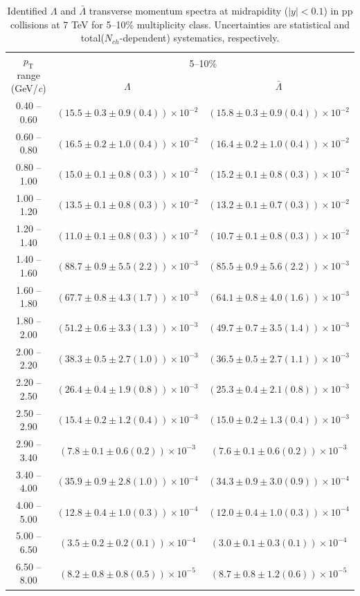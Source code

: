 \begin{table}
\caption{Identified $\Lambda$ and $\bar{\Lambda}$  transverse momentum spectra at midrapidity ($|y|<0.1$) in pp collisions at 7 TeV for 5--10\% multiplicity class. Uncertainties are statistical and total($N_{ch}$-dependent) systematics, respectively.}
\label{tab:Lambda_AntiLambda_5to10}
\begin{center}
\begin{tabular}{ c | c c }
\hline
\multirow{2}{*}{$p_{\mathrm{T}}$ range (GeV/\textit{c})} & \multicolumn{2}{c}{5--10\%} \\ & $\Lambda$& $\bar{\Lambda}$\\ 
\hline
0.40 -- 0.60 & $(15.5\pm0.3\pm0.9(0.4))\times10^{-2}$ & $(15.8\pm0.3\pm0.9(0.4))\times10^{-2}$ \\ 
0.60 -- 0.80 & $(16.5\pm0.2\pm1.0(0.4))\times10^{-2}$ & $(16.4\pm0.2\pm1.0(0.4))\times10^{-2}$ \\ 
0.80 -- 1.00 & $(15.0\pm0.1\pm0.8(0.3))\times10^{-2}$ & $(15.2\pm0.1\pm0.8(0.3))\times10^{-2}$ \\ 
1.00 -- 1.20 & $(13.5\pm0.1\pm0.8(0.3))\times10^{-2}$ & $(13.2\pm0.1\pm0.7(0.3))\times10^{-2}$ \\ 
1.20 -- 1.40 & $(11.0\pm0.1\pm0.8(0.3))\times10^{-2}$ & $(10.7\pm0.1\pm0.8(0.3))\times10^{-2}$ \\ 
1.40 -- 1.60 & $(88.7\pm0.9\pm5.5(2.2))\times10^{-3}$ & $(85.5\pm0.9\pm5.6(2.2))\times10^{-3}$ \\ 
1.60 -- 1.80 & $(67.7\pm0.8\pm4.3(1.7))\times10^{-3}$ & $(64.1\pm0.8\pm4.0(1.6))\times10^{-3}$ \\ 
1.80 -- 2.00 & $(51.2\pm0.6\pm3.3(1.3))\times10^{-3}$ & $(49.7\pm0.7\pm3.5(1.4))\times10^{-3}$ \\ 
2.00 -- 2.20 & $(38.3\pm0.5\pm2.7(1.0))\times10^{-3}$ & $(36.5\pm0.5\pm2.7(1.1))\times10^{-3}$ \\ 
2.20 -- 2.50 & $(26.4\pm0.4\pm1.9(0.8))\times10^{-3}$ & $(25.3\pm0.4\pm2.1(0.8))\times10^{-3}$ \\ 
2.50 -- 2.90 & $(15.4\pm0.2\pm1.2(0.4))\times10^{-3}$ & $(15.0\pm0.2\pm1.3(0.4))\times10^{-3}$ \\ 
2.90 -- 3.40 & $(7.8\pm0.1\pm0.6(0.2))\times10^{-3}$ & $(7.6\pm0.1\pm0.6(0.2))\times10^{-3}$ \\ 
3.40 -- 4.00 & $(35.9\pm0.9\pm2.8(1.0))\times10^{-4}$ & $(34.3\pm0.9\pm3.0(0.9))\times10^{-4}$ \\ 
4.00 -- 5.00 & $(12.8\pm0.4\pm1.0(0.3))\times10^{-4}$ & $(12.0\pm0.4\pm1.0(0.3))\times10^{-4}$ \\ 
5.00 -- 6.50 & $(3.5\pm0.2\pm0.2(0.1))\times10^{-4}$ & $(3.0\pm0.1\pm0.3(0.1))\times10^{-4}$ \\ 
6.50 -- 8.00 & $(8.2\pm0.8\pm0.8(0.5))\times10^{-5}$ & $(8.7\pm0.8\pm1.2(0.6))\times10^{-5}$ \\ 
\hline
\end{tabular}
\end{center}
\end{table}
 
